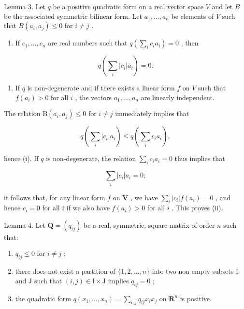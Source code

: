 Lemma 3. Let \(q\) be a positive quadratic form on a real vector space \(V\) and let \(B\) be the associated symmetric bilinear form. Let \(a_1, \ldots, a_n\) be elements of \(V\) such that \(B(a_i, a_j) \leqslant 0\) for \(i \neq j\) .

\begin{enumerate}
\def\labelenumi{(\roman{enumi})}
\tightlist
\item
  If \(c_{1}, \ldots, c_{n}\) are real numbers such that \(q\left(\sum_{i} c_{i} a_{i}\right) = 0\) , then
\end{enumerate}

\[
q \left(\sum_ {i} | c _ {i} | a _ {i}\right) = 0.
\]

\begin{enumerate}
\def\labelenumi{(\roman{enumi})}
\setcounter{enumi}{1}
\tightlist
\item
  If \(q\) is non-degenerate and if there exists a linear form \(f\) on \(V\) such that \(f(a_i) > 0\) for all \(i\) , the vectors \(a_1, \ldots, a_n\) are linearly independent.
\end{enumerate}

The relation \(\mathrm{B}(a_i, a_j) \leqslant 0\) for \(i \neq j\) immediately implies that

\[
q \left(\sum_ {i} | c _ {i} | a _ {i}\right) \leqslant q \left(\sum_ {i} c _ {i} a _ {i}\right),
\]

hence (i). If \(q\) is non-degenerate, the relation \(\sum_{i} c_{i} a_{i} = 0\) thus implies that

\[
\sum_ {i} | c _ {i} | a _ {i} = 0;
\]

it follows that, for any linear form \(f\) on \(\mathbf{V}\) , we have \(\sum_{i}|c_i|f(a_i) = 0\) , and hence \(c_i = 0\) for all \(i\) if we also have \(f(a_i) > 0\) for all \(i\) . This proves (ii).

Lemma 4. Let \(\mathbf{Q} = (q_{ij})\) be a real, symmetric, square matrix of order \(n\) such that:

\begin{enumerate}
\def\labelenumi{\alph{enumi})}
\item
  \(q_{ij} \leqslant 0\) for \(i \neq j\) ;
\item
  there does not exist a partition of \(\{1,2,\ldots,n\}\) into two non-empty subsets I and J such that \((i,j)\in\mathrm{I}\times\mathrm{J}\) implies \(q_{ij}=0\) ;
\item
  the quadratic form \(q(x_{1},\ldots ,x_{n}) = \sum_{i,j}q_{ij}x_{i}x_{j}\) on \(\mathbf{R}^n\) is positive.
\end{enumerate}

